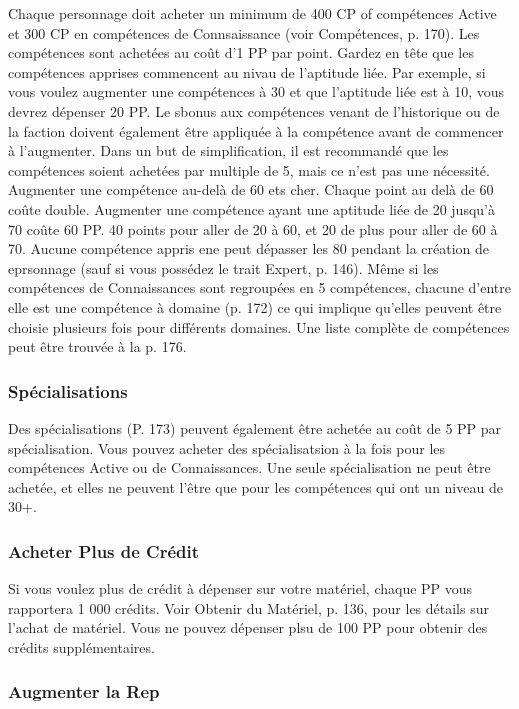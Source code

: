 Chaque personnage doit acheter un minimum de 400 CP of compétences Active et 300 CP en compétences de Connsaissance (voir Compétences, p. 170). Les compétences sont achetées au coût d'1 PP par point. Gardez en tête que les compétences apprises commencent au nivau de l'aptitude liée. Par exemple, si vous voulez augmenter une compétences à 30 et que l'aptitude liée est à 10, vous devrez dépenser 20 PP. Le sbonus aux compétences venant de l'historique ou de la faction doivent également être appliquée à la compétence avant de commencer à l'augmenter. Dans un but de simplification, il est recommandé que les compétences soient achetées par multiple de 5, mais ce n'est pas une nécessité. Augmenter une compétence au-delà de 60 ets cher. Chaque point au delà de 60 coûte double. Augmenter une compétence ayant une aptitude liée de 20 jusqu'à 70 coûte 60 PP. 40 points pour aller de 20 à 60, et 20 de plus pour aller de 60 à 70. Aucune compétence appris ene peut dépasser les 80 pendant la création de eprsonnage (sauf si vous possédez le trait Expert, p. 146). Même si les compétences de Connaissances sont regroupées en 5 compétences, chacune d'entre elle est une compétence à domaine (p. 172) ce qui implique qu'elles peuvent être choisie plusieurs fois pour différents domaines. Une liste complète de compétences peut être trouvée à la p. 176. 

\subsubsection{Spécialisations} \label{sec:buying-specializations} 

Des spécialisations (P. 173) peuvent également être achetée au coût de 5 PP par spécialisation. Vous pouvez acheter des spécialisatsion à la fois pour les compétences Active ou de Connaissances. Une seule spécialisation ne peut être achetée, et elles ne peuvent l'être que pour les compétences qui ont un niveau de 30+. 

\subsubsection{Acheter Plus de Crédit} \label{sec:buying-credit} 

Si vous voulez plus de crédit à dépenser sur votre matériel, chaque PP vous rapportera 1 000 crédits. Voir Obtenir du Matériel, p. 136, pour les détails sur l'achat de matériel. Vous ne pouvez dépenser plsu de 100 PP pour obtenir des crédits supplémentaires. 

\subsubsection{Augmenter la Rep} \label{sec:increasing-rep} 

